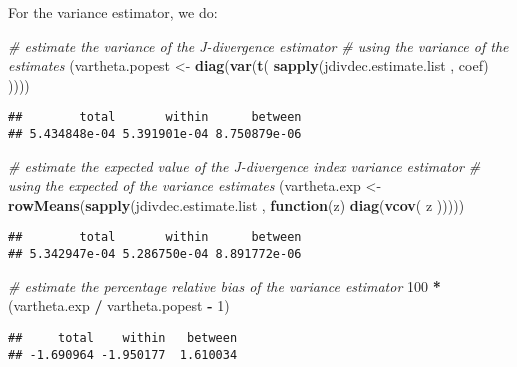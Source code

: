 \documentclass[
]{book}
\newenvironment{Shaded}{\begin{snugshade}}{\end{snugshade}}
\newcommand{\CommentTok}[1]{\textcolor[rgb]{0.56,0.35,0.01}{\textit{#1}}}
\newcommand{\ControlFlowTok}[1]{\textcolor[rgb]{0.13,0.29,0.53}{\textbf{#1}}}
\newcommand{\DecValTok}[1]{\textcolor[rgb]{0.00,0.00,0.81}{#1}}
\newcommand{\FunctionTok}[1]{\textcolor[rgb]{0.13,0.29,0.53}{\textbf{#1}}}
\newcommand{\NormalTok}[1]{#1}
\newcommand{\OtherTok}[1]{\textcolor[rgb]{0.56,0.35,0.01}{#1}}
\newcommand{\SpecialCharTok}[1]{\textcolor[rgb]{0.81,0.36,0.00}{\textbf{#1}}}
\begin{document}
For the variance estimator, we do:

\begin{Shaded}
\begin{Highlighting}[]
\CommentTok{\# estimate the variance of the J{-}divergence estimator}
\CommentTok{\# using the variance of the estimates}
\NormalTok{(vartheta.popest }\OtherTok{\textless{}{-}}
   \FunctionTok{diag}\NormalTok{(}\FunctionTok{var}\NormalTok{(}\FunctionTok{t}\NormalTok{(}
     \FunctionTok{sapply}\NormalTok{(jdivdec.estimate.list , coef)}
\NormalTok{   ))))}
\end{Highlighting}
\end{Shaded}

\begin{verbatim}
##        total       within      between 
## 5.434848e-04 5.391901e-04 8.750879e-06
\end{verbatim}

\begin{Shaded}
\begin{Highlighting}[]
\CommentTok{\# estimate the expected value of the J{-}divergence index variance estimator}
\CommentTok{\# using the expected of the variance estimates}
\NormalTok{(vartheta.exp }\OtherTok{\textless{}{-}}
    \FunctionTok{rowMeans}\NormalTok{(}\FunctionTok{sapply}\NormalTok{(jdivdec.estimate.list , }\ControlFlowTok{function}\NormalTok{(z)}
      \FunctionTok{diag}\NormalTok{(}\FunctionTok{vcov}\NormalTok{(}
\NormalTok{        z}
\NormalTok{      )))))}
\end{Highlighting}
\end{Shaded}

\begin{verbatim}
##        total       within      between 
## 5.342947e-04 5.286750e-04 8.891772e-06
\end{verbatim}

\begin{Shaded}
\begin{Highlighting}[]
\CommentTok{\# estimate the percentage relative bias of the variance estimator}
\DecValTok{100} \SpecialCharTok{*}\NormalTok{ (vartheta.exp }\SpecialCharTok{/}\NormalTok{ vartheta.popest }\SpecialCharTok{{-}} \DecValTok{1}\NormalTok{)}
\end{Highlighting}
\end{Shaded}

\begin{verbatim}
##     total    within   between 
## -1.690964 -1.950177  1.610034
\end{verbatim}
\end{document}
